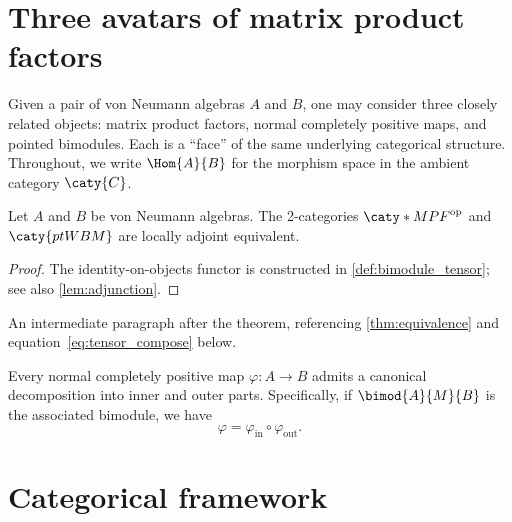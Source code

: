 \documentclass{article}
\numberwithin{equation}{section}
\begin{document}
\START

\section{Three avatars of matrix product factors}%
\label{sec:avatars}

Given a pair of von Neumann algebras $A$ and $B$, one may consider
three closely related objects: matrix product factors, normal completely
positive maps, and pointed bimodules. Each is a ``face'' of the same
underlying categorical structure. Throughout, we write $\Hom{A}{B}$
for the morphism space in the ambient category $\caty{C}$.

\begin{theorem}\label{thm:equivalence}
  Let $A$ and $B$ be von Neumann algebras. The 2-categories
  $\caty*{MPF}^{\mathrm{op}}$ and $\caty{ptWBM}$ are locally adjoint
  equivalent.
\end{theorem}

\begin{proof}
  The identity-on-objects functor is constructed in
  \cref{def:bimodule_tensor}; see also \cref{lem:adjunction}.
\end{proof}

An intermediate paragraph after the theorem, referencing
\cref{thm:equivalence} and equation~\eqref{eq:tensor_compose}
below.

\begin{proposition}\label{prop:decomposition}
  Every normal completely positive map $\varphi\colon A \to B$
  admits a canonical decomposition into inner and outer parts.
  Specifically, if $\bimod{A}{M}{B}$ is the associated bimodule,
  we have
  \begin{equation}\label{eq:inner_outer}
    \varphi = \varphi_{\mathrm{in}} \circ \varphi_{\mathrm{out}}.
  \end{equation}
\end{proposition}

\section{Categorical framework}%
\label{sec:framework}
\end{document}
